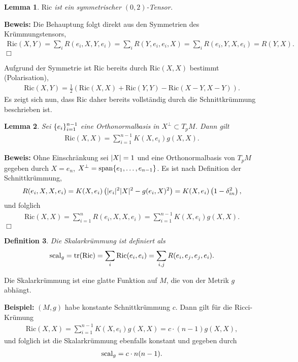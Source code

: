 \documentclass[12pt,a4paper]{article}
\def\Ric{\mathrm{Ric}}
\def\tr{\mathrm{tr}}
\newtheorem{Lemma}{Lemma}[section]
\newtheorem{Definition}[Lemma]{Definition}
\def\proof{\noindent\textbf{Beweis:}\quad}
\def\qed{\quad\hfill\ensuremath{\Box}}
\begin{document}
\bigskip

\begin{Lemma}
$\Ric$ ist ein symmetrischer $(0,2)$-Tensor.
\end{Lemma}

\proof
Die Behauptung folgt direkt aus den Symmetrien des Kr\"ummungstensors,
\begin{align*}
\Ric(X,Y) = \sum_i R(e_i,X,Y,e_i) = 
\sum_i R(Y,e_i,e_i,X) =
\sum_i R(e_i,Y,X,e_i) = R(Y,X). 
\end{align*}
\qed

Aufgrund der Symmetrie ist $\Ric$ bereits durch $\Ric(X,X)$ bestimmt
(Polarisation),
\begin{align*}
\Ric(X,Y) = \frac12\left(\Ric(X,X)+\Ric(Y,Y) - \Ric(X-Y,X-Y) \right).
\end{align*}
 Es zeigt sich nun, dass $\Ric$ daher bereits vollst\"andig durch
die Schnittkr\"ummung beschrieben ist.

\begin{Lemma}
Sei $\{e_i\}_{i=1}^{n-1}$ eine Orthonormalbasis in $X^\bot \subset T_pM$.
Dann gilt
\begin{align*}
\Ric(X,X) = \sum_{i=1}^{n-1} K(X,e_i)g(X,X).
\end{align*}
\end{Lemma}

\proof
Ohne Einschr\"ankung sei $|X| = 1$ und eine Orthonormalbasis von $T_pM$
gegeben durch $X=e_n$, $X^\bot = \mathrm{span}\{e_1,\ldots,e_{n-1}\}$.
Es ist nach Definition der Schnittkr\"ummung,
\begin{align*}
R(e_i,X,X,e_i) = K(X,e_i)\left(|e_i|^2|X|^2 - g(e_i,X)^2 \right) 
= K(X,e_i)\left(1 - \delta_{in}^2 \right),
\end{align*}
und folglich
\begin{align*}
\Ric(X,X) = \sum_{i=1}^n R(e_i,X,X,e_i) = \sum_{i=1}^{n-1} K(X,e_i)g(X,X).
\end{align*}
\qed

\begin{Definition}
Die \emph{Skalarkr\"ummung} ist definiert als
\begin{align*}
\scal_g = \tr(\Ric) = \sum_{i} \Ric(e_i,e_i)
= \sum_{i,j} R(e_i,e_j,e_j,e_i).
\end{align*}
\end{Definition}
Die Skalarkr\"ummung ist eine glatte Funktion auf $M$, die von der Metrik $g$
abh\"angt.

\bigskip

{\bf Beispiel:}
$(M,g)$ habe konstante Schnittkr\"ummung $c$. Dann gilt f\"ur die Ricci-Kr\"umung
\begin{align*}
\Ric(X,X) = \sum_{i=1}^{n-1} K(X,e_i)g(X,X) =  c\cdot(n-1)g(X,X),
\end{align*}
und folglich ist die Skalarkr\"ummung ebenfalls konstant und gegeben durch
\begin{align*}
\mathrm{scal}_g = c\cdot n(n-1).
\end{align*}
\end{document}

